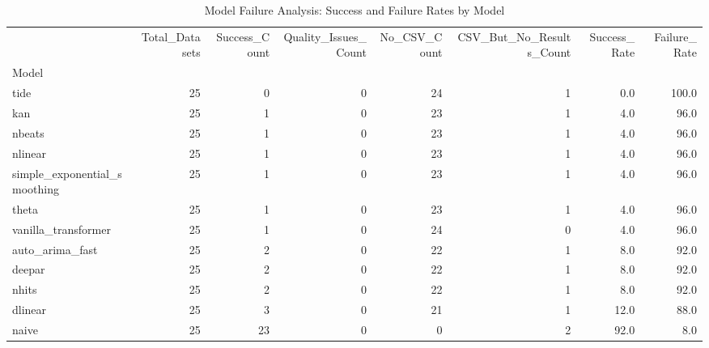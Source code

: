 \begin{table}
\caption{Model Failure Analysis: Success and Failure Rates by Model}
\label{tab:model_failures}
\begin{tabular}{lrrrrrrr}
\toprule
 & Total_Datasets & Success_Count & Quality_Issues_Count & No_CSV_Count & CSV_But_No_Results_Count & Success_Rate & Failure_Rate \\
Model &  &  &  &  &  &  &  \\
\midrule
tide & 25 & 0 & 0 & 24 & 1 & 0.0 & 100.0 \\
kan & 25 & 1 & 0 & 23 & 1 & 4.0 & 96.0 \\
nbeats & 25 & 1 & 0 & 23 & 1 & 4.0 & 96.0 \\
nlinear & 25 & 1 & 0 & 23 & 1 & 4.0 & 96.0 \\
simple_exponential_smoothing & 25 & 1 & 0 & 23 & 1 & 4.0 & 96.0 \\
theta & 25 & 1 & 0 & 23 & 1 & 4.0 & 96.0 \\
vanilla_transformer & 25 & 1 & 0 & 24 & 0 & 4.0 & 96.0 \\
auto_arima_fast & 25 & 2 & 0 & 22 & 1 & 8.0 & 92.0 \\
deepar & 25 & 2 & 0 & 22 & 1 & 8.0 & 92.0 \\
nhits & 25 & 2 & 0 & 22 & 1 & 8.0 & 92.0 \\
dlinear & 25 & 3 & 0 & 21 & 1 & 12.0 & 88.0 \\
naive & 25 & 23 & 0 & 0 & 2 & 92.0 & 8.0 \\
\bottomrule
\end{tabular}
\end{table}
